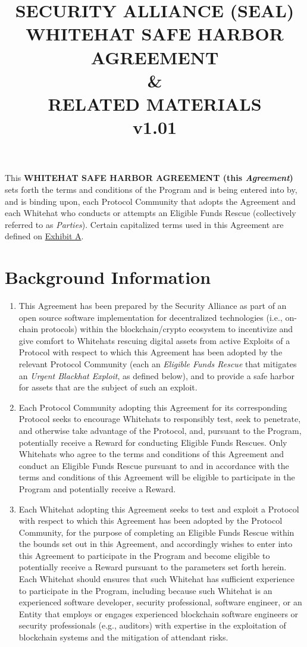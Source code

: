 \documentclass{article}
\title{
    \large
    SECURITY ALLIANCE (SEAL) \\[1ex]
    WHITEHAT SAFE HARBOR AGREEMENT \\
    \& \\
    RELATED MATERIALS \\[4ex]
    v1.01}
\author{}
\date{}
\begin{document}
\maketitle
\newpage

This \textbf{WHITEHAT SAFE HARBOR AGREEMENT (this \textit{Agreement})} sets forth the terms and conditions of the Program and is being entered into by, and is binding upon, each Protocol Community that adopts the Agreement and each Whitehat who conducts or attempts an Eligible Funds Rescue (collectively referred to as \textit{Parties}). Certain capitalized terms used in this Agreement are defined on \underline{Exhibit A}.

\section*{Background Information}\label{sec:background}

\begin{enumerate}
    \item This Agreement has been prepared by the Security Alliance as part of an open source software implementation for decentralized technologies (i.e., on-chain protocols) within the blockchain/crypto ecosystem to incentivize and give comfort to Whitehats rescuing digital assets from active Exploits of a Protocol with respect to which this Agreement has been adopted by the relevant Protocol Community (each an \textit{Eligible Funds Rescue} that mitigates an \textit{Urgent Blackhat Exploit}, as defined below), and to provide a safe harbor for assets that are the subject of such an exploit.

    \item Each Protocol Community adopting this Agreement for its corresponding Protocol seeks to encourage Whitehats to responsibly test, seek to penetrate, and otherwise take advantage of the Protocol, and, pursuant to the Program, potentially receive a Reward for conducting Eligible Funds Rescues. Only Whitehats who agree to the terms and conditions of this Agreement and conduct an Eligible Funds Rescue pursuant to and in accordance with the terms and conditions of this Agreement will be eligible to participate in the Program and potentially receive a Reward.

    \item Each Whitehat adopting this Agreement seeks to test and exploit a Protocol with respect to which this Agreement has been adopted by the Protocol Community, for the purpose of completing an Eligible Funds Rescue within the bounds set out in this Agreement, and accordingly wishes to enter into this Agreement to participate in the Program and become eligible to potentially receive a Reward pursuant to the parameters set forth herein. Each Whitehat should ensures that such Whitehat has sufficient experience to participate in the Program, including because such Whitehat is an experienced software developer, security professional, software engineer, or an Entity that employs or engages experienced blockchain software engineers or security professionals (e.g., auditors) with expertise in the exploitation of blockchain systems and the mitigation of attendant risks.
\end{enumerate}
\end{document}
